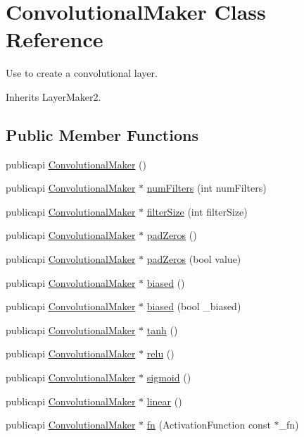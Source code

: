 \hypertarget{classConvolutionalMaker}{\section{Convolutional\-Maker Class Reference}
\label{classConvolutionalMaker}
}


Use to create a convolutional layer.  




Inherits Layer\-Maker2.

\subsection*{Public Member Functions}
\begin{DoxyCompactItemize}
\item 
publicapi \hyperlink{classConvolutionalMaker_ab655c5fcb663c8900c5cd778dfe952c1}{Convolutional\-Maker} ()
\item 
publicapi \hyperlink{classConvolutionalMaker}{Convolutional\-Maker} $\ast$ \hyperlink{classConvolutionalMaker_a3f77a4a09c425e4866dabafe956de09c}{num\-Filters} (int num\-Filters)
\item 
publicapi \hyperlink{classConvolutionalMaker}{Convolutional\-Maker} $\ast$ \hyperlink{classConvolutionalMaker_adbbbd1fdc93d305b44e5f1b98a085d29}{filter\-Size} (int filter\-Size)
\item 
publicapi \hyperlink{classConvolutionalMaker}{Convolutional\-Maker} $\ast$ \hyperlink{classConvolutionalMaker_a998421866237c8ea2e441c65612a28cd}{pad\-Zeros} ()
\item 
publicapi \hyperlink{classConvolutionalMaker}{Convolutional\-Maker} $\ast$ \hyperlink{classConvolutionalMaker_aad43ffb6fafbd49135ada836b8a04bdd}{pad\-Zeros} (bool value)
\item 
publicapi \hyperlink{classConvolutionalMaker}{Convolutional\-Maker} $\ast$ \hyperlink{classConvolutionalMaker_ad5a5fd7acd9b11520bf75a111b8f0c43}{biased} ()
\item 
publicapi \hyperlink{classConvolutionalMaker}{Convolutional\-Maker} $\ast$ \hyperlink{classConvolutionalMaker_a4719e41e2003ebe46a5d1f384a3221fd}{biased} (bool \-\_\-biased)
\item 
publicapi \hyperlink{classConvolutionalMaker}{Convolutional\-Maker} $\ast$ \hyperlink{classConvolutionalMaker_a354a1bf139846c69fcdbe45f445c7288}{tanh} ()
\item 
publicapi \hyperlink{classConvolutionalMaker}{Convolutional\-Maker} $\ast$ \hyperlink{classConvolutionalMaker_a709a6868eae125ce2f4a400cc6d99a3b}{relu} ()
\item 
publicapi \hyperlink{classConvolutionalMaker}{Convolutional\-Maker} $\ast$ \hyperlink{classConvolutionalMaker_af5bd2fbe033f0553c4fa788bbc6d8c6d}{sigmoid} ()
\item 
publicapi \hyperlink{classConvolutionalMaker}{Convolutional\-Maker} $\ast$ \hyperlink{classConvolutionalMaker_ad9070dd472a245523f8efcf3cc55987e}{linear} ()
\item 
publicapi \hyperlink{classConvolutionalMaker}{Convolutional\-Maker} $\ast$ \hyperlink{classConvolutionalMaker_a3589399372a01d8d4380d6bb7d0341bb}{fn} (Activation\-Function const $\ast$\-\_\-fn)
\end{DoxyCompactItemize}
